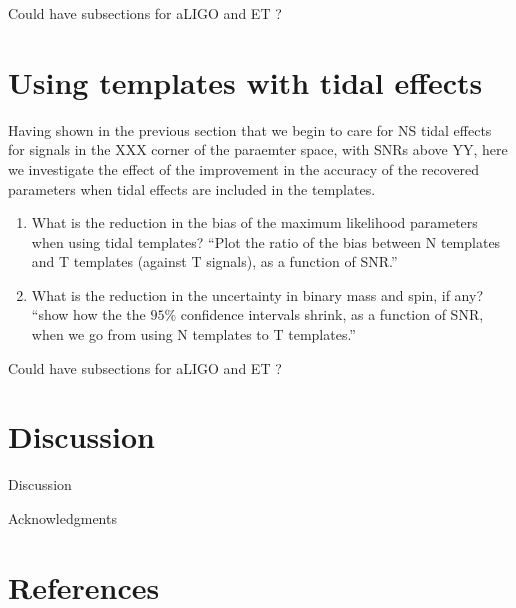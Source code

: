 \documentclass[aps,prd,amsmath,floats,floatfix, twocolumn,
superscriptaddress,nofootinbib,showpacs]{revtex4-1}
\begin{document}
Could have subsections for aLIGO and ET ?

\section{Using templates with tidal effects}
Having shown in the previous section that we begin to care for NS tidal effects
for signals in the XXX corner of the paraemter space, with SNRs above YY, here
we investigate the effect of the improvement in the accuracy of the recovered
parameters when tidal effects are included in the templates.

\begin{enumerate}
\item What is the reduction in the bias of the maximum likelihood parameters
when using tidal templates?\newline
``Plot the ratio of the bias between N templates and T templates (against T
signals), as a function of SNR.''
\item What is the reduction in the uncertainty in binary mass and spin, if
any?\newline
``show how the the $95\%$ confidence intervals shrink, as a function of SNR, 
when we go from using N templates to T templates.''
\end{enumerate}



Could have subsections for aLIGO and ET ?


\section{Discussion}
Discussion

\begin{acknowledgments}
Acknowledgments
\end{acknowledgments}

\section*{References}

\end{document}
